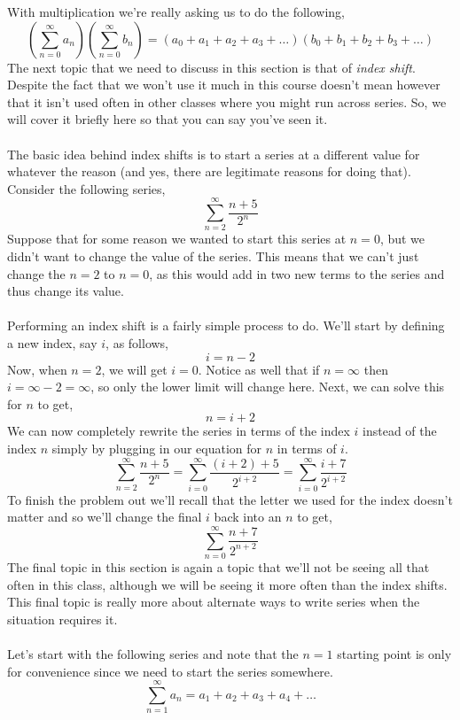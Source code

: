 \documentclass[10pt,reqno]{book}
\theoremstyle{definition}
\begin{document}
	With multiplication we're really asking us to do the following,
	\[ \left( \sum\limits_{n=0}^{\infty} a_n \right)  \left( \sum\limits_{n=0}^{\infty} b_n \right) = (a_0 + a_1 + a_2 + a_3 + \ldots) (b_0 + b_1 + b_2 + b_3 + \ldots) \]
	The next topic that we need to discuss in this section is that of \textit{index shift}. Despite the fact that we won't use it much in this course doesn't mean however that it isn't used often in other classes where you might run across series. So, we will cover it briefly here so that you can say you've seen it.\\ \\
	The basic idea behind index shifts is to start a series at a different value for whatever the reason (and yes, there are legitimate reasons for doing that). Consider the following series,
	\[ \sum\limits_{n=2}^{\infty} \frac{n+5}{2^n} \]
	Suppose that for some reason we wanted to start this series at $ n=0 $, but we didn't want to change the value of the series. This means that we can't just change the $ n=2 $ to $ n=0 $, as this would add in two new terms to the series and thus change its value.\\ \\
	Performing an index shift is a fairly simple process to do. We'll start by defining a new index, say $ i $, as follows,
	\[ i = n-2 \]
	Now, when $ n=2 $, we will get $ i=0 $. Notice as well that if $ n=\infty $ then $ i = \infty - 2 = \infty $, so only the lower limit will change here. Next, we can solve this for $ n $ to get,
	\[ n = i + 2 \]
	We can now completely rewrite the series in terms of the index $ i $ instead of the index $ n $ simply by plugging in our equation for $ n $ in terms of $ i $.
	\[ \sum\limits_{n=2}^{\infty} \frac{n+5}{2^n} = \sum\limits_{i=0}^{\infty} \frac{(i+2)+5}{2^{i+2}} = \sum\limits_{i=0}^{\infty} \frac{i+7}{2^{i+2}} \]
	To finish the problem out we'll recall that the letter we used for the index doesn't matter and so we'll change the final $ i $ back into an $ n $ to get,
	\[ \sum\limits_{n=0}^{\infty} \frac{n+7}{2^{n+2}} \]
	The final topic in this section is again a topic that we'll not be seeing all that often in this class, although we will be seeing it more often than the index shifts. This final topic is really more about alternate ways to write series when the situation requires it.\\ \\
	Let's start with the following series and note that the $ n=1 $ starting point is only for convenience since we need to start the series somewhere. 
	\[ \sum\limits_{n=1}^{\infty} a_n = a_1 + a_2 + a_3 + a_4 + \ldots \]
\end{document}
